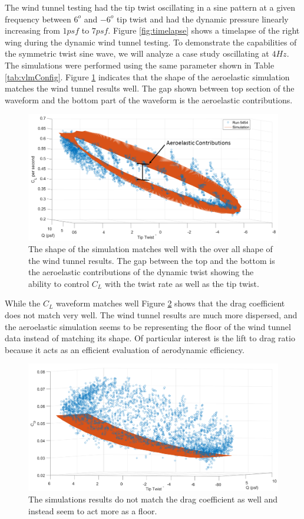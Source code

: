 \documentclass[11pt]{ucthesis}
\begin{document}
The wind tunnel testing had the tip twist oscillating in a sine pattern at a given frequency between $6^o$ and $-6^o$ tip twist and had the dynamic pressure linearly increasing from $1 psf$ to $7 psf$. Figure \ref{fig:timelapse} shows a timelapse of the right wing during the dynamic wind tunnel testing. To demonstrate the capabilities of the symmetric twist sine wave, we will analyze a case study oscillating at $4 Hz$. The simulations were performed using the same parameter shown in Table \ref{tab:vlmConfig}. Figure \ref{fig:CLRun5454} indicates that the shape of the aeroelastic simulation matches the wind tunnel results well. The gap shown between top section of the waveform and the bottom part of the waveform is the aeroelastic contributions. 
\begin{figure}[thpb]
\centering
\includegraphics[width=.7\linewidth]{Figures/Run5454CLAeroelastic.png}
\caption{The shape of the simulation matches well with the over all shape of the wind tunnel results. The gap between the top and the bottom is the aeroelastic contributions of the dynamic twist showing the ability to control $C_L$ with the twist rate as well as the tip twist.}
\label{fig:CLRun5454}
\end{figure}
While the $C_L$ waveform matches well Figure \ref{fig:CDRun5454}  shows that the drag coefficient does not match very well. The wind tunnel results are much more dispersed, and the aeroelastic simulation seems to be representing the floor of the wind tunnel data instead of matching its shape. Of particular interest is the lift to drag ratio because it acts as an efficient evaluation of aerodynamic efficiency. 

\begin{figure}[thpb]
\centering
\includegraphics[width=.75\linewidth]{Figures/CD5454.png}
\caption{The simulations results do not match the drag coefficient as well and instead seem to act more as a floor.}
\label{fig:CDRun5454}
\end{figure}
\end{document}

